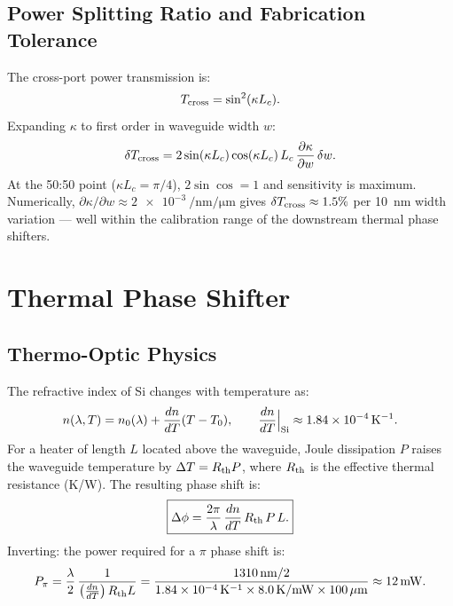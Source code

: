 \documentclass[12pt, a4paper]{article}
\begin{document}
\subsection{Power Splitting Ratio and Fabrication Tolerance}

The cross-port power transmission is:
\begin{equation}
  T_{\rm cross} = \sin^2(\kappa L_c).
  \label{eq:T_cross}
\end{equation}
Expanding $\kappa$ to first order in waveguide width $w$:
\begin{equation}
  \delta T_{\rm cross}
  = 2\sin(\kappa L_c)\cos(\kappa L_c)\, L_c\,
    \frac{\partial\kappa}{\partial w}\,\delta w.
  \label{eq:T_sensitivity}
\end{equation}
At the 50:50 point ($\kappa L_c = \pi/4$), $2\sin\cos = 1$ and sensitivity is
maximum.
Numerically, $\partial\kappa/\partial w \approx \SI{2e-3}{\per\nano\metre\per\micro\metre}$
gives $\delta T_{\rm cross} \approx 1.5\%$ per \SI{10}{\nano\metre} width
variation — well within the calibration range of the downstream thermal phase
shifters.

\section{Thermal Phase Shifter}
\label{sec:tps}

\subsection{Thermo-Optic Physics}

The refractive index of Si changes with temperature as:
\begin{equation}
  n(\lambda, T) = n_0(\lambda) + \frac{dn}{dT}(T - T_0),
  \qquad \frac{dn}{dT}\Big|_{\rm Si} \approx 1.84\times 10^{-4}\,\mathrm{K^{-1}}.
  \label{eq:thermo_optic}
\end{equation}
For a heater of length $L$ located above the waveguide, Joule dissipation $P$
raises the waveguide temperature by $\Delta T = R_{\rm th} P$, where
$R_{\rm th}$ is the effective thermal resistance (K/W).
The resulting phase shift is:
\begin{equation}
  \boxed{
  \Delta\phi = \frac{2\pi}{\lambda}\,\frac{dn}{dT}\,R_{\rm th}\,P\,L.
  }
  \label{eq:phase_power}
\end{equation}
Inverting: the power required for a $\pi$ phase shift is:
\begin{equation}
  P_\pi = \frac{\lambda}{2}\,\frac{1}{\left(\tfrac{dn}{dT}\right) R_{\rm th} L}
  = \frac{1310\,\mathrm{nm}/2}{1.84\times10^{-4}\,\mathrm{K^{-1}}
    \times 8.0\,\mathrm{K/mW}
    \times 100\,\mathrm{\mu m}}
  \approx 12\,\mathrm{mW}.
  \label{eq:p_pi}
\end{equation}
\end{document}
